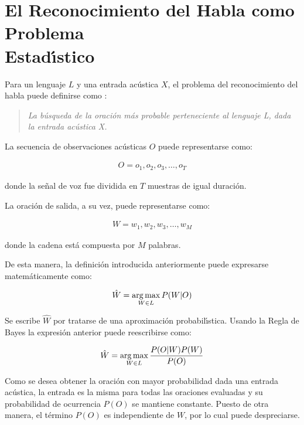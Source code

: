 

\section[El Reconocimiento del Habla como Problema Estad{\'\i}stico]
{El Reconocimiento del Habla como Problema \\ Estad{\'\i}stico}

Para un lenguaje $L$ y una entrada ac\'ustica $X$, el problema del reconocimiento del habla puede definirse 
como \cite{Jurafsky}:

\begin{quote}
\emph{La b\'usqueda de la oraci\'on m\'as probable perteneciente al lenguaje L, dada la entrada ac\'ustica X.}
\end{quote}

La secuencia de observaciones ac\'usticas $O$ puede representarse como:

\begin{align}
O = o_1,o_2,o_3,\ldots,o_T\label{eq:asrO}
\end{align}

donde la se\~nal de voz fue dividida en $T$ muestras de igual duraci\'on.

La oraci\'on de salida, a su vez, puede representarse como:

\begin{align}
W  = w_1,w_2,w_3,\ldots,w_M\label{eq:asrW}
\end{align}

donde la cadena est\'a compuesta por $M$ palabras.

De esta manera, la definici\'on introducida anteriormente puede expresarse matem\'aticamente como:

\begin{align}
\hat{W} = \operatorname*{arg\,max}_{W \in L} P(W|O)
\end{align}

Se escribe $\hat{W}$ por tratarse de una aproximaci\'on probabil{\'\i}stica.
Usando la Regla de Bayes la expresi\'on anterior puede reescribirse como:

\begin{align}
\hat{W} = \operatorname*{arg\,max}_{W \in L} \frac{P(O|W)P(W)}{P(O)}
\end{align}

Como se desea obtener la oraci\'on con mayor probabilidad dada una entrada ac\'ustica, la entrada es
la misma para todas las oraciones evaluadas y su probabilidad de ocurrencia $P(O)$ se mantiene constante.
Puesto de otra manera, el t\'ermino $P(O)$ es independiente de $W$, por lo cual puede despreciarse. 

